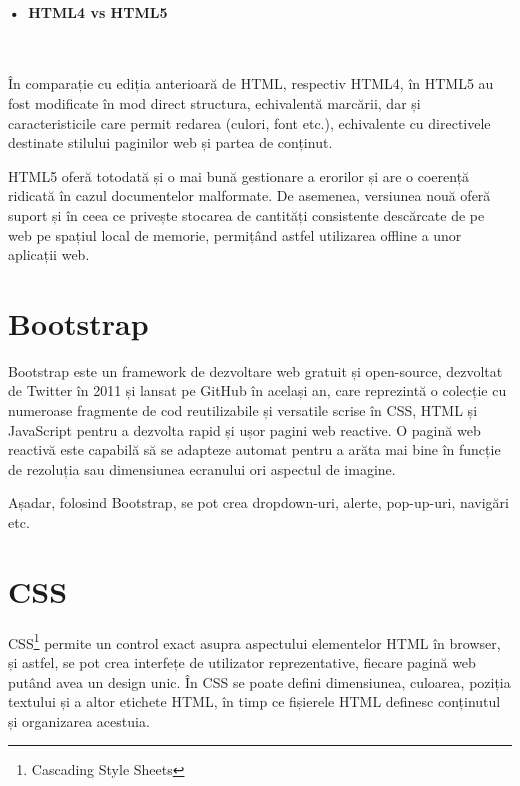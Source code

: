 \paragraph{•\, HTML4 vs HTML5}\,\newline

În comparație cu ediția anterioară de HTML, respectiv HTML4, în HTML5 au fost modificate în mod direct structura, echivalentă marcării, dar și caracteristicile care permit redarea (culori, font etc.), echivalente cu directivele destinate stilului paginilor web și partea de conținut.\newline

HTML5 oferă totodată și o mai bună gestionare a erorilor și are o coerență ridicată în cazul documentelor malformate. De asemenea, versiunea nouă oferă suport și în ceea ce privește stocarea de cantități consistente descărcate de pe web pe spațiul local de memorie, permițând astfel utilizarea offline a unor aplicații web.
\newline

\section{Bootstrap}

Bootstrap este un framework de dezvoltare web gratuit și open-source, dezvoltat de Twitter în 2011 și lansat pe GitHub în același an, care reprezintă o colecție cu numeroase fragmente de cod reutilizabile și versatile scrise în CSS, HTML și JavaScript pentru a dezvolta rapid și ușor pagini web reactive.\newline
O pagină web reactivă este capabilă să se adapteze automat pentru a arăta mai bine în funcție de rezoluția sau dimensiunea ecranului ori aspectul de imagine.\newline

Așadar, folosind Bootstrap, se pot crea dropdown-uri, alerte, pop-up-uri, navigări etc.

\section{CSS}

CSS\footnote{Cascading Style Sheets} permite un control exact asupra aspectului elementelor HTML în browser, și astfel, se pot crea interfețe de utilizator reprezentative, fiecare pagină web putând avea un design unic. În CSS se poate defini dimensiunea, culoarea, poziția textului și a altor etichete HTML, în timp ce fișierele HTML definesc conținutul și organizarea acestuia.\newline

